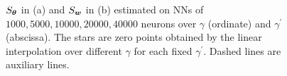 \documentclass{article}
\begin{document}
\begin{figure}
    \begin{centering}
        \par\end{centering}
    \caption{$S_{\bm{\theta}}$ in (a) and $S_{\bm{w}}$ in (b) estimated on NNs of $1000,5000,10000,20000,40000$ neurons over $\gamma$ (ordinate) and $\gamma^{\prime}$ (abscissa). The stars are zero points obtained by the linear interpolation over different $\gamma$ for each fixed $\gamma^{\prime}$. Dashed lines are auxiliary lines.   \label{fig:theta_a_slope} }
\end{figure}
\end{document}
